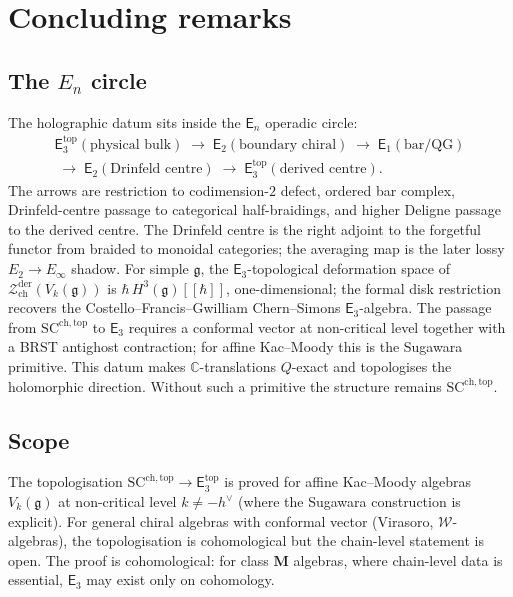 \documentclass[11pt,reqno]{amsart}
\theoremstyle{definition}
\theoremstyle{remark}
\newcommand{\cW}{\mathcal{W}}
\newcommand{\cZ}{\mathcal{Z}}
\newcommand{\Eone}{\mathsf{E}_{1}}
\newcommand{\Etwo}{\mathsf{E}_{2}}
\newcommand{\Ethree}{\mathsf{E}_{3}}
\newcommand{\En}{\mathsf{E}_{n}}
\newcommand{\SCchtop}{\mathrm{SC}^{\mathrm{ch,top}}}
\newcommand{\fg}{\mathfrak{g}}
\newcommand{\bC}{\mathbb{C}}
\numberwithin{equation}{section}
\begin{document}
\section{Concluding remarks}\label{sec:conclusion}

\subsection{The $E_n$ circle}\label{subsec:en-circle}

The holographic datum sits inside the $\En$ operadic circle:
\begin{multline*}
\Ethree^{\mathrm{top}}(\text{physical bulk})
\;\to\;
\Etwo(\text{boundary chiral})
\;\to\;
\Eone(\text{bar/QG})\\
\;\to\;
\Etwo(\text{Drinfeld centre})
\;\to\;
\Ethree^{\mathrm{top}}(\text{derived centre}).
\end{multline*}
The arrows are restriction to codimension-$2$ defect, ordered bar
complex, Drinfeld-centre passage to categorical half-braidings, and
higher Deligne passage to the derived centre. The Drinfeld centre is
the right adjoint to the forgetful functor from braided to monoidal
categories; the averaging map is the later lossy
$E_2\to E_\infty$ shadow. For simple $\fg$, the
$\Ethree$-topological deformation space of
$\cZ^{\mathrm{der}}_{\mathrm{ch}}(V_k(\fg))$ is
$\hbar\,H^3(\fg)[[\hbar]]$, one-dimensional; the formal disk
restriction recovers the Costello--Francis--Gwilliam Chern--Simons
$\Ethree$-algebra. The passage from $\SCchtop$ to $\Ethree$ requires
a conformal vector at non-critical level together with a BRST
antighost contraction; for affine Kac--Moody this is the Sugawara
primitive. This datum makes $\bC$-translations $Q$-exact and
topologises the holomorphic direction. Without such a primitive the
structure remains $\SCchtop$.

\subsection{Scope}\label{subsec:scope}

The topologisation $\SCchtop \to \Ethree^{\mathrm{top}}$ is proved
for affine Kac--Moody algebras $V_k(\fg)$ at non-critical level
$k \neq -h^\vee$ (where the Sugawara construction is explicit). For
general chiral algebras with conformal vector (Virasoro, $\cW$-algebras),
the topologisation is cohomological but the chain-level statement is
open. The proof is cohomological: for class $\mathbf{M}$ algebras,
where chain-level data is essential, $\Ethree$ may exist only on
cohomology.
\end{document}
